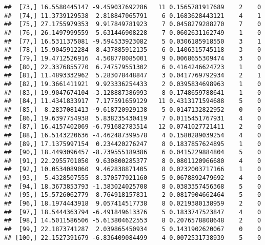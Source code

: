 \documentclass[]{article}
\begin{document}
\begin{verbatim}
##  [73,] 16.5580445147 -9.459037692286   11 0.1565781917689    2    0
##  [74,] 11.3739129538  2.818847065791    6 0.1683628443121    4    1
##  [75,] 27.1755979353  9.917849781923    7 0.0458279288270    7    0
##  [76,] 26.1497999559  5.631446908228    7 0.0602631162749    1    0
##  [77,] 16.5311375081 -9.594533923082    5 0.0306185918550    3    1
##  [78,] 15.9045912284  8.437885912135    6 0.1406315745118    3    0
##  [79,] 19.4712526916  4.508778085001    9 0.0068655309474    3    0
##  [80,] 22.3376855770  6.747579551302    6 0.4164246624723    1    0
##  [81,] 11.4893332962  5.283078448847    3 0.0417769792934    2    1
##  [82,] 19.3661411921  9.923336254433    2 0.0395834698963    1    0
##  [83,] 19.9047674104 -3.128887386993    8 0.1748659788641    1    0
##  [84,] 11.4341833917  7.177591659129   11 0.4313171594688    5    0
##  [85,]  8.2837081413 -9.618720929138    5 0.0147132822952    0    0
##  [86,] 19.6397754938  5.838235430419    7 0.0115451767931    4    0
##  [87,] 16.4157402069 -6.791682783514   12 0.0741027721411    2    0
##  [88,] 16.5143220636 -4.462487399578    4 0.1580289039254    4    0
##  [89,] 17.1375997154  0.234420276247    8 0.1837857624895    1    0
##  [90,] 18.4493096457 -8.739555189386    6 0.0415229884804    5    0
##  [91,] 22.2955701050  9.630800285377    8 0.0801120966680    4    0
##  [92,] 10.0534089060  9.462838871405    8 0.0232003717166    1    0
##  [93,]  5.4328507555  8.370577921160    5 0.0678892479692    4    0
##  [94,] 18.3673853793 -1.383024025708    8 0.0383357456368    5    0
##  [95,] 15.5726062779  8.764918157831    2 0.0817904662464    5    0
##  [96,] 18.1974443918  9.057414517738    8 0.0219380138959    2    0
##  [97,] 18.5444363794 -6.491849613376    5 0.1833747523847    4    0
##  [98,] 14.5011586506 -5.613804622553    8 0.2076578808648    2    0
##  [99,] 22.1873741287  2.039865450934    5 0.1431902620067    0    0
## [100,] 22.1527391679 -6.836409084499    4 0.0072531738939    5    0
\end{verbatim}
\end{document}
